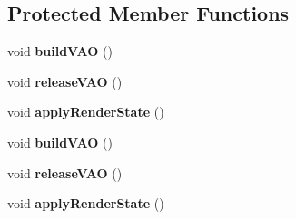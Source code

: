 \subsection*{Protected Member Functions}
\begin{DoxyCompactItemize}
\item 
\mbox{\label{classMeshCommand_a874215c57fa7a9caa6bbaf8a16098a92}} 
void {\bfseries build\+V\+AO} ()
\item 
\mbox{\label{classMeshCommand_a47b25193fe3ea11d173dd259cf59d836}} 
void {\bfseries release\+V\+AO} ()
\item 
\mbox{\label{classMeshCommand_a5a47e92058709a828fb44cce30d2787e}} 
void {\bfseries apply\+Render\+State} ()
\item 
\mbox{\label{classMeshCommand_a874215c57fa7a9caa6bbaf8a16098a92}} 
void {\bfseries build\+V\+AO} ()
\item 
\mbox{\label{classMeshCommand_a47b25193fe3ea11d173dd259cf59d836}} 
void {\bfseries release\+V\+AO} ()
\item 
\mbox{\label{classMeshCommand_a5a47e92058709a828fb44cce30d2787e}} 
void {\bfseries apply\+Render\+State} ()
\end{DoxyCompactItemize}
